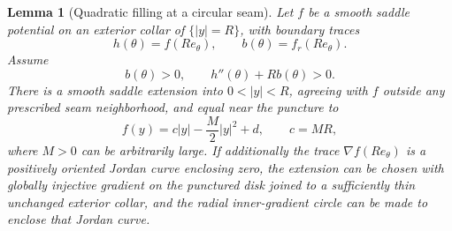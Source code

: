 \documentclass[11pt]{amsart}
\newtheorem{lemma}[theorem]{Lemma}
\theoremstyle{definition}
\theoremstyle{remark}
\numberwithin{equation}{section}
\begin{document}
\begin{lemma}[Quadratic filling at a circular seam]
\label{lem:quadratic-filling}
Let $f$ be a smooth saddle potential on an exterior collar of
$\{|y|=R\}$, with boundary traces
\[
 h(\theta)=f(Re_\theta),\qquad b(\theta)=f_r(Re_\theta).
\]
Assume
\begin{equation}\label{eq:radial-fill-data}
 b(\theta)>0,\qquad h''(\theta)+Rb(\theta)>0.
\end{equation}
There is a smooth saddle extension into $0<|y|<R$, agreeing with $f$
outside any prescribed seam neighborhood, and equal near the puncture to
\begin{equation}\label{eq:quadratic-germ}
 f(y)=c|y|-\frac M2|y|^2+d,\qquad c=MR,
\end{equation}
where $M>0$ can be arbitrarily large. If additionally the trace
$\nabla f(Re_\theta)$ is a positively oriented Jordan curve enclosing
zero, the extension can be chosen with globally injective gradient on
the punctured disk joined to a sufficiently thin unchanged exterior
collar, and the radial inner-gradient circle can be made
to enclose that Jordan curve.
\end{lemma}
\end{document}
